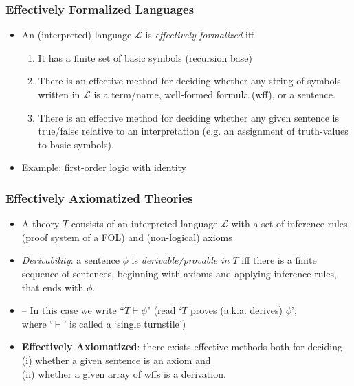 \begin{frame}
\frametitle{Effectively Formalized Languages}

\begin{itemize}[<+->]


\item An (interpreted) language $\mathcal{L}$ is \emph{effectively formalized} iff

\begin{enumerate}[1.)]

\item It has a finite set of basic symbols (recursion base)

\item There is an effective method for deciding whether any string of symbols written in $\mathcal{L}$ is a term/name, well-formed formula (wff), or a sentence.

\item There is an effective method for deciding whether any given sentence is true/false relative to an interpretation (e.g. an assignment of truth-values to basic symbols). 



\end{enumerate}

\item Example: first-order logic with identity 

\end{itemize}
\end{frame}

\begin{frame}
\frametitle{Effectively Axiomatized Theories}

\begin{itemize}[<+->]

\item A theory $T$ consists of an interpreted language $\mathcal{L}$ with a set of inference rules (proof system of a FOL) and (non-logical) axioms

\item \emph{Derivability}: a sentence $\phi$ is \emph{derivable/provable in $T$} iff there is a finite sequence of sentences, beginning with axioms and applying inference rules, that ends with $\phi$.

\item[] -- In this case we write ``$T \vdash \phi$" (read `$T$ proves (a.k.a. derives) $\phi$'; \\ where `$\vdash$' is called a `single turnstile')

\item \textbf{Effectively Axiomatized}: there exists effective methods both for deciding (i) whether a given sentence is an axiom and \\ (ii) whether a given array of wffs is a derivation. 


\end{itemize}
\end{frame}



